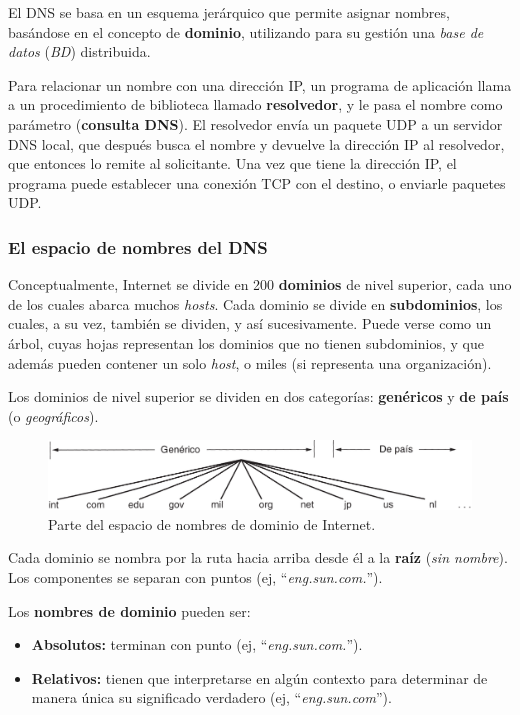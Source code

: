 \documentclass[10pt,a4paper]{article}
\begin{document}
El DNS se basa en un esquema jerárquico que permite asignar nombres, basándose en el concepto de \textbf{dominio}, utilizando para su gestión una \textit{base de datos} (\textit{BD}) distribuida.

Para relacionar un nombre con una dirección IP, un programa de aplicación llama a un procedimiento de biblioteca llamado \textbf{resolvedor}, y le pasa el nombre como parámetro (\textbf{consulta DNS}). El resolvedor envía un paquete UDP a un servidor DNS local, que después busca el nombre y devuelve la dirección IP al resolvedor, que entonces lo remite al solicitante. Una vez que tiene la dirección IP, el programa puede establecer una conexión TCP con el destino, o enviarle paquetes UDP.

\subsubsection{El espacio de nombres del DNS}

Conceptualmente, Internet se divide en 200 \textbf{dominios} de nivel superior, cada uno de los cuales abarca muchos \textit{hosts}. Cada dominio se divide en \textbf{subdominios}, los cuales, a su vez, también se dividen, y así sucesivamente. Puede verse como un árbol, cuyas hojas representan los dominios que no tienen subdominios, y que además pueden contener un solo \textit{host}, o miles (si representa una organización).

Los dominios de nivel superior se dividen en dos categorías: \textbf{genéricos} y \textbf{de país} (o \textit{geográficos}).

\begin{figure}[ht!]
  \caption{Parte del espacio de nombres de dominio de Internet.}
  \label{fig:DNS_espacio_nombres}
  \centerline{\includegraphics[width=0.9\textwidth-\fboxrule-\fboxrule]{imgs/DNS_espacio_nombres.png}}
\end{figure}

Cada dominio se nombra por la ruta hacia arriba desde él a la \textbf{raíz} (\textit{sin nombre}). Los componentes se separan con puntos (ej, ``\textit{eng.sun.com.}'').

Los \textbf{nombres de dominio} pueden ser:
\begin{itemize}
\item \textbf{Absolutos:} terminan con punto (ej, ``\textit{eng.sun.com.}'').
\item \textbf{Relativos:} tienen que interpretarse en algún contexto para determinar de manera única su significado verdadero (ej, ``\textit{eng.sun.com}'').
\end{itemize}
\end{document}
